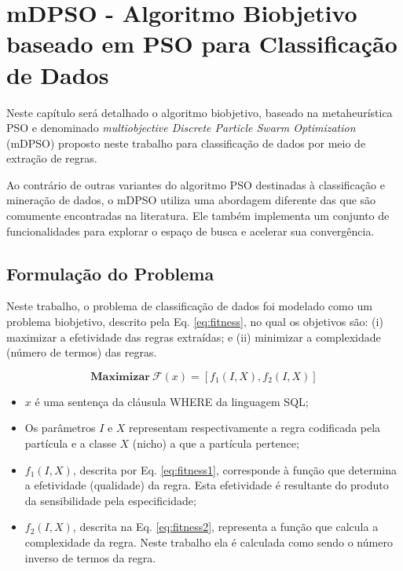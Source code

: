 \documentclass[
	12pt,				%
	openany,			%
	oneside,	
	a4paper,			%
	brazil,				%
	]{unimontes-ppgmsc-abntex2}
\begin{document}

\chapter{mDPSO - Algoritmo Biobjetivo baseado em PSO para Classificação de Dados}
\label{ch:mdpso}

Neste capítulo será detalhado o algoritmo biobjetivo, baseado na metaheurística PSO e denominado {\em multiobjective Discrete Particle Swarm Optimization} (mDPSO) proposto neste trabalho para classificação de dados por meio de extração de regras. 

Ao contrário de outras variantes do algoritmo PSO destinadas à classificação e mineração de dados, o mDPSO utiliza uma abordagem diferente das que são comumente encontradas na literatura. Ele também implementa um conjunto de funcionalidades para explorar o espaço de busca e acelerar sua convergência.

\section{Formulação do Problema}
\label{sec:form_problema}

Neste trabalho, o problema de classificação de dados foi modelado como um problema  biobjetivo, descrito pela Eq. \ref{eq:fitness}, no qual os objetivos são: (i) maximizar a efetividade das regras extraídas; e (ii) minimizar a complexidade (número de termos) das regras. 

\begin{equation}
\label{eq:fitness}
\textbf{Maximizar}\ \mathcal{F}(x) = [f_1(I,X), f_2(I,X)]
\end{equation}

\begin{itemize}
   \item $x$ é uma sentença da cláusula WHERE da linguagem SQL;
   \item Os parâmetros $I$ e $X$ representam respectivamente a regra codificada pela partícula e a classe $X$ (nicho) a que a partícula pertence;
   \item $f_1(I,X)$, descrita por Eq. \ref{eq:fitness1}, corresponde à função que determina a efetividade (qualidade) da regra. Esta efetividade é resultante do produto da sensibilidade pela especificidade; 
   \item $f_2(I,X)$, descrita na Eq. \ref{eq:fitness2}, representa a função que calcula a complexidade da regra. Neste trabalho ela é calculada como sendo o número inverso de termos da regra.
\end{itemize}
\end{document}

